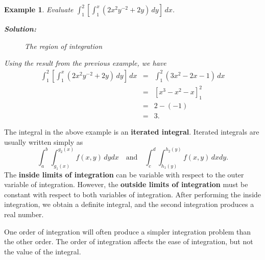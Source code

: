 \documentclass[titlepage,a4paper,12pt]{report}
\newtheorem{example}{Example}[section]
\begin{document}
\begin{example}
Evaluate $\displaystyle \int _1^2\left[ \int _1^x (2x^2y^{-2}+2y)\, dy\right]\, dx$.

\noindent \textbf{Solution:}
\begin{figure}[h!]

\caption{The region of integration}
\end{figure}

 Using the result from the previous example, we have 
\begin{eqnarray*}
\int _1^2\left[ \int _1^x (2x^2y^{-2}+2y)\, dy\right]\, dx &=& \int _1^2 (3x^2-2x-1)\, dx\\
&=& \left[ x^3-x^2-x\right]_1^2 \\
&=& 2-(-1)\\
&=& 3.
\end{eqnarray*} 
\end{example}
\noindent The integral in the above example is an \textbf{iterated integral}. Iterated integrals are usually written simply as 
\[\int _a^b \int _{g_1(x)}^{g_2(x)}f(x,y)\, dydx \quad \mbox{and} \quad \int _c^d \int _{h_1(y)}^{h_2(y)}f(x,y)\, dxdy.\]
The \textbf{inside limits of integration} can be variable with respect to the outer variable of integration. However, the \textbf{outside limits of integration} must be constant with respect to both variables of integration. After performing the inside integration, we obtain a definite integral, and the second integration produces a real number.

\noindent One order of integration will often produce a simpler integration problem than the other order. The order of integration affects the ease of integration, but not the value of the integral.
\end{document}
